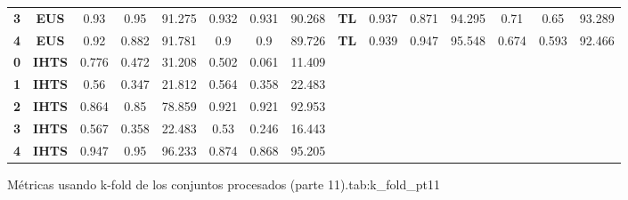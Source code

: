 {{\begin{tabular}{c|c|cccccc|ccccccc}
\textbf{3} & \textbf{EUS} & 0.93  & 0.95  & 91.275 & 0.932 & 0.931 & 90.268 & \multicolumn{1}{c|}{\textbf{TL}} & 0.937 & 0.871 & 94.295 & 0.71  & 0.65  & 93.289 \\
\textbf{4} & \textbf{EUS} & 0.92  & 0.882 & 91.781 & 0.9   & 0.9   & 89.726 & \multicolumn{1}{c|}{\textbf{TL}} & 0.939 & 0.947 & 95.548 & 0.674 & 0.593 & 92.466 \\
\textbf{0} & \textbf{IHTS} & 0.776 & 0.472 & 31.208 & 0.502 & 0.061 & 11.409 &       &       &       &       &       &       &  \\
\textbf{1} & \textbf{IHTS} & 0.56  & 0.347 & 21.812 & 0.564 & 0.358 & 22.483 &       &       &       &       &       &       &  \\
\textbf{2} & \textbf{IHTS} & 0.864 & 0.85  & 78.859 & 0.921 & 0.921 & 92.953 &       &       &       &       &       &       &  \\
\textbf{3} & \textbf{IHTS} & 0.567 & 0.358 & 22.483 & 0.53  & 0.246 & 16.443 &       &       &       &       &       &       &  \\
\textbf{4} & \textbf{IHTS} & 0.947 & 0.95  & 96.233 & 0.874 & 0.868 & 95.205 &       &       &       &       &       &       &  \\
\end{tabular}}}{Métricas usando k-fold de los conjuntos procesados (parte 11).}{tab:k_fold_pt11}